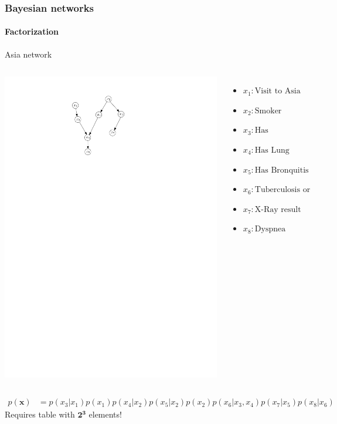 \documentclass[slidestop,compress,mathserif]{beamer}
\newcommand{\bi}{\begin{itemize}}
\newcommand{\ei}{\end{itemize}}
\begin{document}
\begin{frame}
	\frametitle{Bayesian networks}
	\framesubtitle{Factorization}
    \begin{description}
    \item[Asia network]
    \end{description}
    \begin{columns}
    \begin{center}
    \includegraphics[width=.7\textwidth]{asia}%
    \end{center}
    \bi
     \item $x_1: \text{Visit to Asia}$
     \item  $x_2: \text{Smoker}$
     \item  $x_3: \text{Has Tuberculosis}$
     \item  $x_4: \text{Has Lung Cancer}$
     \item  $x_5: \text{Has Bronquitis}$
     \item  $x_6: \text{Tuberculosis or Cancer}$
     \item  $x_7: \text{X-Ray result}$
     \item  $x_8: \text{Dyspnea}$
    \ei
         \end{columns}
         \begin{align*}
         p(\mathbf{x}) & = p(x_3|x_1)p(x_1)p(x_4|x_2)p(x_5|x_2)p(x_2)p(x_6|x_3,x_4)p(x_7|x_5)p(x_8|x_6)
         \end{align*}
         Requires table with $\mathbf{2^3}$ elements!
\end{frame}
\end{document}
